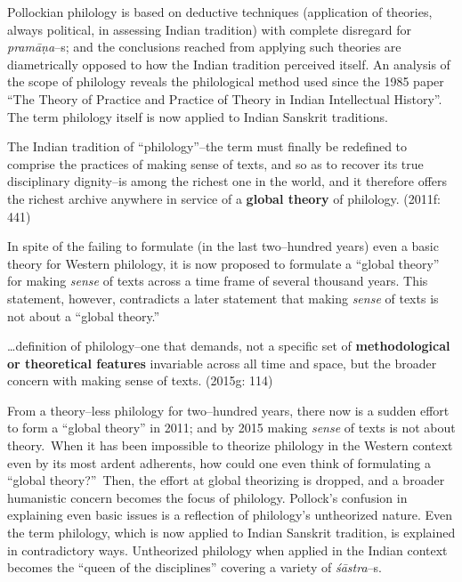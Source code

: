 Pollockian philology is based on deductive techniques (application of theories, always political, in assessing Indian tradition) with complete disregard for \textit{pramāṇa}–s; and the conclusions reached from applying such theories are diametrically opposed to how the Indian tradition perceived itself. An analysis of the scope of philology reveals the philological method used since the 1985 paper “The Theory of Practice and Practice of Theory in Indian Intellectual History”. The term philology itself is now applied to Indian Sanskrit traditions.

\begin{myquote}
The Indian tradition of “philology”–the term must finally be redefined to comprise the practices of making sense of texts, and so as to recover its true disciplinary dignity–is among the richest one in the world, and it therefore offers the richest archive anywhere in service of a \textbf{global theory} of philology. (2011f: 441)
\end{myquote}

In spite of the failing to formulate (in the last two–hundred years) even a basic theory for Western philology, it is now proposed to formulate a “global theory” for making \textit{sense} of texts across a time frame of several thousand years. This statement, however, contradicts a later statement that making \textit{sense} of texts is not about a “global theory.”

\begin{myquote}
…definition of philology–one that demands, not a speciﬁc set of \textbf{methodological or theoretical features} invariable across all time and space, but the broader concern with making sense of texts. (2015g: 114)
\end{myquote}


From a theory–less philology for two–hundred years, there now is a sudden effort to form a “global theory” in 2011; and by 2015 making \textit{sense} of texts is not about theory.~When it has been impossible to theorize philology in the Western context even by its most ardent adherents, how could one even think of formulating a “global theory?”~Then, the effort at global theorizing is dropped, and a broader humanistic concern becomes the focus of philology. Pollock’s confusion in explaining even basic issues is a reflection of philology’s untheorized nature. Even the term philology, which is now applied to Indian Sanskrit tradition, is explained in contradictory ways. Untheorized philology when applied in the Indian context becomes the “queen of the disciplines” covering a variety of \textit{śāstra}–s.

